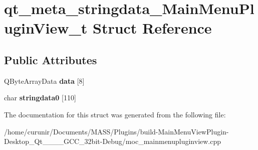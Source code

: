 \hypertarget{structqt__meta__stringdata___main_menu_plugin_view__t}{}\section{qt\+\_\+meta\+\_\+stringdata\+\_\+\+Main\+Menu\+Plugin\+View\+\_\+t Struct Reference}
\label{structqt__meta__stringdata___main_menu_plugin_view__t}
\subsection*{Public Attributes}
\begin{DoxyCompactItemize}
\item 
Q\+Byte\+Array\+Data {\bfseries data} \mbox{[}8\mbox{]}\hypertarget{structqt__meta__stringdata___main_menu_plugin_view__t_ac70f82887e71e21309a9b80f0e3ceefc}{}\label{structqt__meta__stringdata___main_menu_plugin_view__t_ac70f82887e71e21309a9b80f0e3ceefc}

\item 
char {\bfseries stringdata0} \mbox{[}110\mbox{]}\hypertarget{structqt__meta__stringdata___main_menu_plugin_view__t_a79971d790269f5b9e01072043dff36be}{}\label{structqt__meta__stringdata___main_menu_plugin_view__t_a79971d790269f5b9e01072043dff36be}

\end{DoxyCompactItemize}


The documentation for this struct was generated from the following file\+:\begin{DoxyCompactItemize}
\item 
/home/curunir/\+Documents/\+M\+A\+S\+S/\+Plugins/build-\/\+Main\+Menu\+View\+Plugin-\/\+Desktop\+\_\+\+Qt\+\_\+\_\+\_\+\_\+\+G\+C\+C\+\_\+32bit-\/\+Debug/moc\+\_\+mainmenupluginview.\+cpp\end{DoxyCompactItemize}
